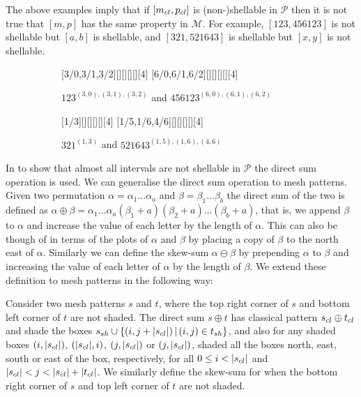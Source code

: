 \documentclass[11pt,a4paper,oneside]{article}
\begin{document}
The above examples imply that if $[m_{cl},p_{cl}]$ is (non-)shellable in $\mathcal{P}$
then it is not true that $[m,p]$ has the same property in $\mathcal{M}$. For example,
$[123,456123]$ is not shellable but $[a,b]$ is shellable, and
$[321,521643]$ is shellable but $[x,y]$
is not shellable.

\begin{figure}[h]\centering
\begin{subfigure}{0.45\textwidth}\centering
{}[3/0,3/1,3/2][][][][][4]
[6/0,6/1,6/2][][][][][4]
\caption{$123^{(3,0),(3,1),(3,2)}$ and $456123^{(6,0),(6,1),(6,2)}$}\label{fig:123}
\end{subfigure}
\begin{subfigure}{0.45\textwidth}\centering
{}[1/3][][][][][4]
[1/5,1/6,4/6][][][][][4]
\caption{$321^{(1, 3)}$ and $521643^{(1, 5), (1, 6), (4, 6)}$}\label{fig:321}
\end{subfigure}
\caption{}
\end{figure}

In \cite{McSt13} to show that almost all intervals are not shellable in $\mathcal{P}$
the direct sum operation is used. We can generalise the direct sum operation to
mesh patterns. Given two permutation $\alpha=\alpha_1\ldots\alpha_a$ and
$\beta=\beta_1\ldots\beta_b$ the direct sum of the two is defined as
$\alpha\oplus\beta=\alpha_1\ldots\alpha_a(\beta_1+a)(\beta_2+a)\ldots(\beta_b+a)$,
that is, we append $\beta$ to $\alpha$ and increase the value of each letter by the
length of $\alpha$. This can also be though of in terms of the plots of $\alpha$
and $\beta$ by placing a copy of $\beta$ to the north east of $\alpha$.
Similarly we can define the skew-sum $\alpha\ominus\beta$ by
prepending $\alpha$ to $\beta$ and increasing the value of each letter of $\alpha$ 
by the length of $\beta$. We extend these definition to mesh patterns in the following way:

\begin{defn}\label{defn:directsum}
Consider two mesh patterns $s$ and $t$, where the top right corner of $s$
and bottom left corner of $t$ are not shaded. The direct sum $s\oplus t$ has classical pattern
$s_{cl}\oplus t_{cl}$ and shade the boxes $s_{sh}\cup\{(i,j+|s_{cl}|)\,|\,(i,j)\in t_{sh}\}$,
and also for any shaded boxes $(i,|s_{cl}|)$, $(|s_{cl}|,i)$, $(j,|s_{cl}|)$ or $(j,|s_{cl}|)$,
shaded all the boxes north, east, south or east of the box, respectively,
for all $0\le i< |s_{cl}|$ and $|s_{cl}|< j< |s_{cl}|+|t_{cl}|$.  We similarly
define the skew-sum for when the bottom right corner of $s$ and top left corner of $t$ are not shaded.
\end{defn}
\end{document}
